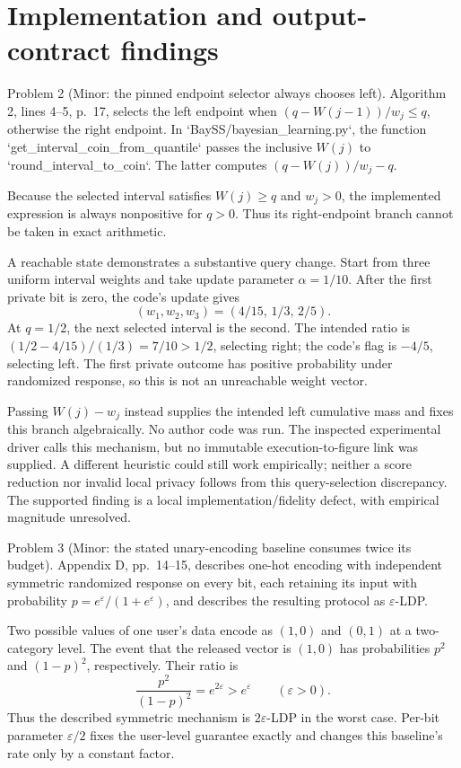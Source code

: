 \documentclass[10pt]{article}
\begin{document}
\section*{Implementation and output-contract findings}
Problem 2 (Minor: the pinned endpoint selector always chooses left).  Algorithm 2, lines 4–5, p. 17, selects the left endpoint when \((q-W(j-1))/w_j\leq q\), otherwise the right endpoint. In `BaySS/bayesian\_learning.py`, the function `get\_interval\_coin\_from\_quantile` passes the inclusive \(W(j)\) to `round\_interval\_to\_coin`. The latter computes \((q-W(j))/w_j-q\).\par
Because the selected interval satisfies \(W(j)\geq q\) and \(w_j>0\), the implemented expression is always nonpositive for \(q>0\). Thus its right-endpoint branch cannot be taken in exact arithmetic.\par
A reachable state demonstrates a substantive query change. Start from three uniform interval weights and take update parameter \(\alpha=1/10\). After the first private bit is zero, the code’s update gives \[(w_1,w_2,w_3)=(4/15,\,1/3,\,2/5).\] At \(q=1/2\), the next selected interval is the second. The intended ratio is \((1/2-4/15)/(1/3)=7/10>1/2\), selecting right; the code’s flag is \(-4/5\), selecting left. The first private outcome has positive probability under randomized response, so this is not an unreachable weight vector.\par
Passing \(W(j)-w_j\) instead supplies the intended left cumulative mass and fixes this branch algebraically. No author code was run. The inspected experimental driver calls this mechanism, but no immutable execution-to-figure link was supplied. A different heuristic could still work empirically; neither a score reduction nor invalid local privacy follows from this query-selection discrepancy. The supported finding is a local implementation/fidelity defect, with empirical magnitude unresolved.\par
Problem 3 (Minor: the stated unary-encoding baseline consumes twice its budget).  Appendix D, pp. 14–15, describes one-hot encoding with independent symmetric randomized response on every bit, each retaining its input with probability \(p=e^\varepsilon/(1+e^\varepsilon)\), and describes the resulting protocol as \(\varepsilon\)-LDP.\par
Two possible values of one user’s data encode as \((1,0)\) and \((0,1)\) at a two-category level. The event that the released vector is \((1,0)\) has probabilities \(p^2\) and \((1-p)^2\), respectively. Their ratio is \[\frac{p^2}{(1-p)^2}=e^{2\varepsilon}>e^\varepsilon
 \qquad(\varepsilon>0).\] Thus the described symmetric mechanism is \(2\varepsilon\)-LDP in the worst case. Per-bit parameter \(\varepsilon/2\) fixes the user-level guarantee exactly and changes this baseline’s rate only by a constant factor.\par
\end{document}
